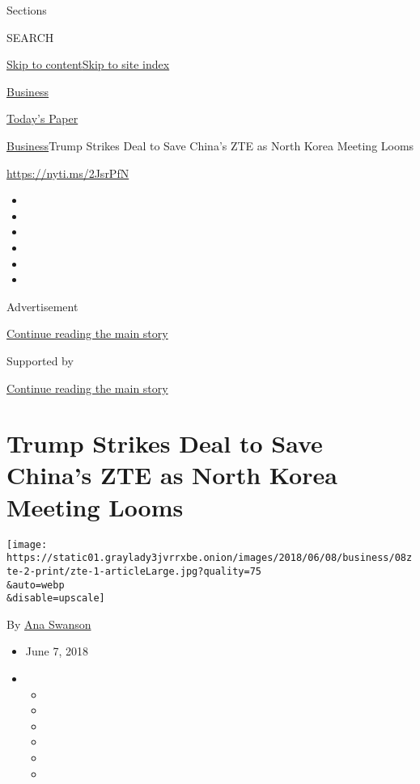 Sections

SEARCH

\protect\hyperlink{site-content}{Skip to
content}\protect\hyperlink{site-index}{Skip to site index}

\href{https://www.nytimes3xbfgragh.onion/section/business}{Business}

\href{https://myaccount.nytimes3xbfgragh.onion/auth/login?response_type=cookie\&client_id=vi}{}

\href{https://www.nytimes3xbfgragh.onion/section/todayspaper}{Today's
Paper}

\href{/section/business}{Business}\textbar{}Trump Strikes Deal to Save
China's ZTE as North Korea Meeting Looms

\href{https://nyti.ms/2JsrPfN}{https://nyti.ms/2JsrPfN}

\begin{itemize}
\item
\item
\item
\item
\item
\item
\end{itemize}

Advertisement

\protect\hyperlink{after-top}{Continue reading the main story}

Supported by

\protect\hyperlink{after-sponsor}{Continue reading the main story}

\hypertarget{trump-strikes-deal-to-save-chinas-zte-as-north-korea-meeting-looms}{%
\section{Trump Strikes Deal to Save China's ZTE as North Korea Meeting
Looms}\label{trump-strikes-deal-to-save-chinas-zte-as-north-korea-meeting-looms}}

\texttt{[image: https://static01.graylady3jvrrxbe.onion/images/2018/06/08/business/08zte-2-print/zte-1-articleLarge.jpg?quality=75\\\&auto=webp\\\&disable=upscale]}

By \href{https://www.nytimes3xbfgragh.onion/by/ana-swanson}{Ana Swanson}

\begin{itemize}
\item
  June 7, 2018
\item
  \begin{itemize}
  \item
  \item
  \item
  \item
  \item
  \item
  \end{itemize}
\end{itemize}

